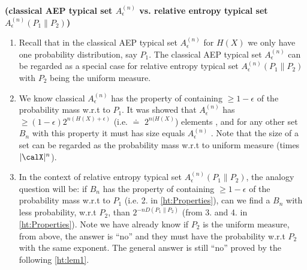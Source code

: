\documentclass{article}
\newcommand{\bfs}[1]{\textbf{({#1})}}
\begin{document}
\begin{rema}{\bfs{classical AEP typical set $A_{\epsilon}^{(n)}$ vs. relative entropy typical set $A_{\epsilon}^{(n)}\left(P_{1} \| P_{2}\right)$}}
\begin{enumerate}
    \item  Recall that in the classical AEP typical set $A_{\epsilon}^{(n)}$ for $H(X)$ we only have one probability distribution, say $P_1$. The classical AEP typical set $A_{\epsilon}^{(n)}$ can be regarded as a special case for relative entropy typical set $A_{\epsilon}^{(n)}\left(P_{1} \| P_{2}\right)$ with $P_{2}$ being the uniform measure. 
    \item 
 We know classical $A_{\epsilon}^{(n)}$ has the property of containing $\geq 1-\epsilon$ of the probability mass w.r.t to $P_1$. It was showed that $A_{\epsilon}^{(n)}$ has $\geq (1-\epsilon)2^{n(H(X)+\epsilon)}$ (i.e. $\doteq$ $2^{n(H(X)}$) elements , and for any other set $B_{n}$ with this property it must has size equals $A_{\epsilon}^{(n)}$ . Note that the size of a set can be regarded as the probability mass w.r.t to uniform measure (times $|\calX|^{n}$). \label{ht:reit2}
 
 \item In the context of relative entropy typical set $A_{\epsilon}^{(n)}\left(P_{1} \| P_{2}\right)$, the analogy question will be: if $B_{n}$ has the property of containing $\geq 1-\epsilon$ of the probability mass w.r.t to $P_1$ (i.e. 2. in \cref{ht:Properties}),  can we find a $B_{n}$ with less probability, w.r.t $P_2$, than $2^{-nD(P_{1} \| P_{2})}$ (from 3. and 4. in \cref{ht:Properties}). Note we have already know  if $P_2$ is the uniform measure, from above, the answer is ``no'' and they must have the probability w.r.t  $P_2$ with the same exponent. The general answer is still ``no'' proved by the following \cref{ht:lem1}. 
\end{enumerate}
\end{rema}
\end{document}

